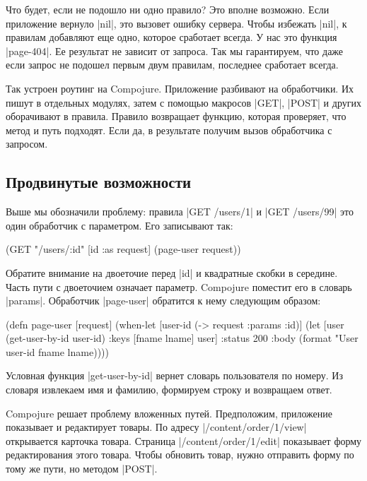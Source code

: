 Что будет, если не подошло ни одно правило? Это вполне возможно. Если приложение
вернуло \spverb|nil|, это вызовет ошибку сервера. Чтобы избежать \spverb|nil|, к
правилам добавляют еще одно, которое сработает всегда. У нас это функция
\spverb|page-404|. Ее результат не зависит от запроса. Так мы гарантируем, что
даже если запрос не подошел первым двум правилам, последнее сработает всегда.

Так устроен роутинг на Compojure. Приложение разбивают на обработчики.  Их пишут
в отдельных модулях, затем с помощью макросов \spverb|GET|, \spverb|POST| и
других оборачивают в правила. Правило возвращает функцию, которая проверяет, что
метод и путь подходят. Если да, в результате получим вызов обработчика с
запросом.

\subsection{Продвинутые возможности}

Выше мы обозначили проблему: правила \spverb|GET /users/1|
и \spverb|GET /users/99| это один обработчик с параметром. Его записывают так:

\begin{english}
  \begin{clojure}
(GET "/users/:id" [id :as request] (page-user request))
  \end{clojure}
\end{english}

Обратите внимание на двоеточие перед \spverb|id| и квадратные скобки в середине.
Часть пути с двоеточием означает параметр. Compojure поместит его в словарь
\spverb|params|. Обработчик \spverb|page-user| обратится к нему следующим
образом:

\begin{english}
  \begin{clojure}
(defn page-user [request]
  (when-let [user-id (-> request :params :id)]
    (let [user (get-user-by-id user-id)
          {:keys [fname lname]} user]
      {:status 200
       :body (format "User %
                     user-id fname lname)})))
  \end{clojure}
\end{english}

Условная функция \spverb|get-user-by-id| вернет словарь пользователя по
номеру. Из словаря извлекаем имя и фамилию, формируем строку и возвращаем ответ.

Compojure решает проблему вложенных путей. Предположим, приложение показывает и
редактирует товары. По адресу \spverb|/content/order/1/view| открывается
карточка товара. Страница \spverb|/content/order/1/edit| показывает форму
редактирования этого товара. Чтобы обновить товар, нужно отправить форму по тому
же пути, но методом \spverb|POST|.

